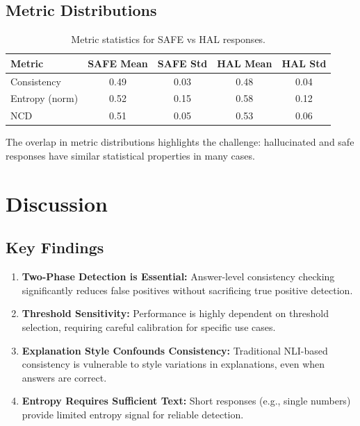 \subsection{Metric Distributions}

\begin{table}[!htbp]
    \centering
    \caption{Metric statistics for SAFE vs HAL responses.}
    \label{tab:metric_stats}
    \begin{tabular}{lcccc}
        \toprule
        Metric & SAFE Mean & SAFE Std & HAL Mean & HAL Std \\
        \midrule
        Consistency & 0.49 & 0.03 & 0.48 & 0.04 \\
        Entropy (norm) & 0.52 & 0.15 & 0.58 & 0.12 \\
        NCD & 0.51 & 0.05 & 0.53 & 0.06 \\
        \bottomrule
    \end{tabular}
\end{table}

The overlap in metric distributions highlights the challenge: hallucinated and safe responses have similar statistical properties in many cases.

\section{Discussion}

\subsection{Key Findings}

\begin{enumerate}
    \item \textbf{Two-Phase Detection is Essential:} Answer-level consistency checking significantly reduces false positives without sacrificing true positive detection.

    \item \textbf{Threshold Sensitivity:} Performance is highly dependent on threshold selection, requiring careful calibration for specific use cases.

    \item \textbf{Explanation Style Confounds Consistency:} Traditional NLI-based consistency is vulnerable to style variations in explanations, even when answers are correct.

    \item \textbf{Entropy Requires Sufficient Text:} Short responses (e.g., single numbers) provide limited entropy signal for reliable detection.
\end{enumerate}

